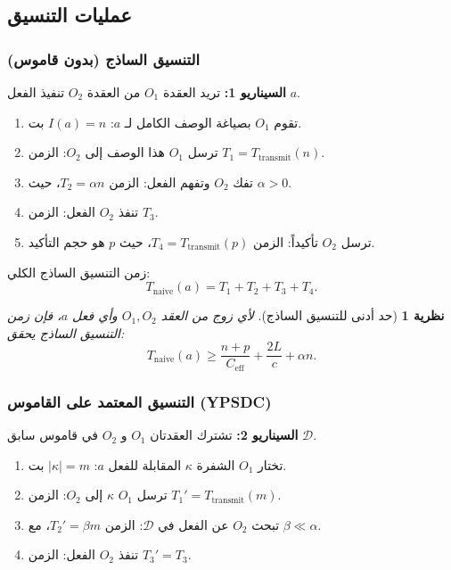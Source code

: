 \documentclass[11pt,a4paper]{article}
\newtheorem{theorem}{نظرية}
\begin{document}
	\subsection{عمليات التنسيق}
	\label{app:coordination-processes}
	
	\subsubsection{التنسيق الساذج (بدون قاموس)}
	
	\textbf{السيناريو 1:} تريد العقدة $O_1$ من العقدة $O_2$ تنفيذ الفعل $a$.
	
	\begin{enumerate}
		\item تقوم $O_1$ بصياغة الوصف الكامل لـ $a$: $I(a) = n$ بت.
		\item ترسل $O_1$ هذا الوصف إلى $O_2$: الزمن $T_1 = T_{\text{transmit}}(n)$.
		\item تفك $O_2$ وتفهم الفعل: الزمن $T_2 = \alpha n$، حيث $\alpha > 0$.
		\item تنفذ $O_2$ الفعل: الزمن $T_3$.
		\item ترسل $O_2$ تأكيداً: الزمن $T_4 = T_{\text{transmit}}(p)$، حيث $p$ هو حجم التأكيد.
	\end{enumerate}
	
	زمن التنسيق الساذج الكلي:
	\[
	T_{\text{naive}}(a) = T_1 + T_2 + T_3 + T_4.
	\]
	
	\begin{theorem}[حد أدنى للتنسيق الساذج]
		\label{thm:naive-lower-bound}
		لأي زوج من العقد $O_1, O_2$ وأي فعل $a$، فإن زمن التنسيق الساذج يحقق:
		\[
		T_{\text{naive}}(a) \geq \frac{n + p}{C_{\text{eff}}} + \frac{2L}{c} + \alpha n.
		\]
	\end{theorem}
	
	\subsubsection{التنسيق المعتمد على القاموس (YPSDC)}
	
	\textbf{السيناريو 2:} تشترك العقدتان $O_1$ و $O_2$ في قاموس سابق $\mathcal{D}$.
	
	\begin{enumerate}
		\item تختار $O_1$ الشفرة $\kappa$ المقابلة للفعل $a$: $|\kappa| = m$ بت.
		\item ترسل $O_1$ $\kappa$ إلى $O_2$: الزمن $T_1' = T_{\text{transmit}}(m)$.
		\item تبحث $O_2$ عن الفعل في $\mathcal{D}$: الزمن $T_2' = \beta m$، مع $\beta \ll \alpha$.
		\item تنفذ $O_2$ الفعل: الزمن $T_3' = T_3$.
	\end{enumerate}
	
\end{document}
